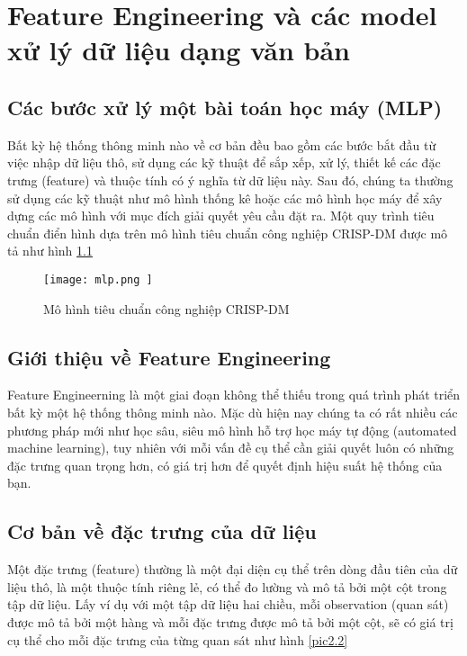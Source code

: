 \chapter{Feature Engineering và các model xử lý dữ liệu dạng văn bản}
 \label{Chapter2}

\section{Các bước xử lý một bài toán học máy (MLP)}
Bất kỳ hệ thống thông minh nào về cơ bản đều bao gồm các bước bắt đầu từ việc nhập dữ liệu thô, sử dụng các kỹ thuật để sắp xếp, xử lý, thiết kế các đặc trưng (feature) và thuộc tính có ý nghĩa từ dữ liệu này. Sau đó, chúng ta thường sử dụng các kỹ thuật như mô hình thống kê hoặc các mô hình học máy để xây dựng các mô hình với mục đích giải quyết yêu cầu đặt ra. Một quy trình tiêu chuẩn điển hình dựa trên mô hình tiêu chuẩn công nghiệp CRISP-DM được mô tả như hình \ref{pic2.1}

\begin{figure}[h!]
	\centering
	\texttt{[image: 
		mlp.png
	]}
	\caption[Mô hình tiêu chuẩn công nghiệp CRISP-DM]{
		Mô hình tiêu chuẩn công nghiệp CRISP-DM \label{pic2.1}
	}
\end{figure}

\section{Giới thiệu về Feature Engineering}
Feature Engineerning là một giai đoạn không thể thiếu trong quá trình phát triển bất kỳ một hệ thống thông minh nào. Mặc dù hiện nay chúng ta có rất nhiều các phương pháp mới như học sâu, siêu mô hình hỗ trợ học máy tự động (automated machine learning), tuy nhiên với mỗi vấn đề cụ thể cần giải quyết luôn có những đặc trưng quan trọng hơn, có giá trị hơn để quyết định hiệu suất hệ thống của bạn.


\section{Cơ bản về đặc trưng của dữ liệu}

Một đặc trưng (feature) thường là một đại diện cụ thể trên dòng đầu tiên của dữ liệu thô, là một thuộc tính riêng lẻ, có thể đo lường và mô tả bởi một cột trong tập dữ liệu. Lấy ví dụ với một tập dữ liệu hai chiều, mỗi observation (quan sát) được mô tả bởi một hàng và mỗi đặc trưng được mô tả bởi một cột, sẽ có giá trị cụ thể cho mỗi đặc trưng của từng quan sát như hình \ref{pic2.2}

